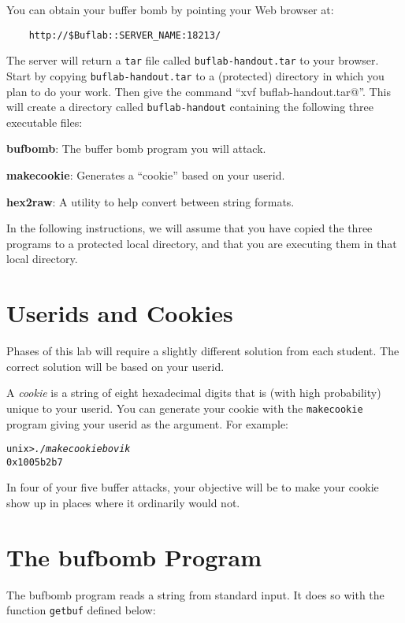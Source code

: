 \documentclass[11pt]{article}
\newenvironment{tty}%
{\small\begin{alltt}}%
{\end{alltt}}
\begin{document}
You can obtain your buffer bomb by pointing your Web browser at:

\begin{verbatim}
    http://$Buflab::SERVER_NAME:18213/
\end{verbatim}

The server will return a \texttt{tar} file called
\texttt{buflab-handout.tar} to your browser.  Start by copying
\texttt{buflab-handout.tar} to a (protected) directory in which you
plan to do your work.  Then give the command
``\verb@tar xvf buflab-handout.tar@''.  This will create a directory
called \texttt{buflab-handout} containing the following three
executable files:
\begin{description}
\item {\bf bufbomb}: The buffer bomb program you will attack.
\item {\bf makecookie}: Generates a ``cookie'' based on your userid.
\item {\bf hex2raw}: A utility to help convert between string formats.
\end{description}

In the following instructions, we will assume that you have copied the
three programs to a protected local directory, and that you are
executing them in that local directory.


\section*{Userids and Cookies}

Phases of this lab will require a slightly different solution from
each student. The correct solution will be based on your userid.

A {\em cookie} is a string of eight hexadecimal digits that is (with
high probability) unique to your userid.  You can generate your cookie
with the {\tt makecookie} program giving your userid as the
argument.  For example:
\begin{tty}
unix>{\em ./makecookie bovik}
0x1005b2b7
\end{tty}

In four of your five buffer attacks, your objective will be to make
your cookie show up in places where it ordinarily would not.


\section*{The {\sc bufbomb} Program}

The {\sc bufbomb} program reads a string from standard input. It does
so with the function {\tt getbuf} defined below:
\end{document}
